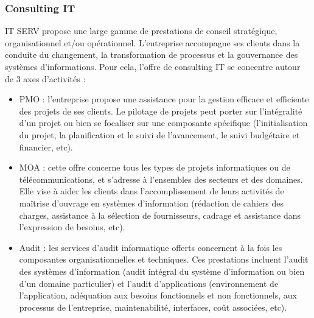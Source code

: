 \begin{spacing}{1.5}
\subsubsection*{Consulting IT} %
IT SERV propose une large gamme de prestations de conseil stratégique, organisationnel et/ou opérationnel. L'entreprise accompagne ses clients dans la conduite du changement, la transformation de processus et la gouvernance des systèmes d’informations. Pour cela, l'offre de consulting IT se concentre autour de 3 axes d’activités :
\begin{itemize}
    \item PMO : l'entreprise propose une assistance pour la gestion efficace et efficiente des projets de ses clients. Le pilotage de projets peut porter sur l’intégralité d’un projet ou bien se focaliser sur une composante spécifique (l’initialisation du projet, la planification et le suivi de l’avancement, le suivi budgétaire et financier, etc).
    \item MOA : cette offre concerne tous les types de projets informatiques ou de télécommunications, et s’adresse à l’ensembles des secteurs et des domaines. Elle vise à aider les clients dans l’accomplissement de leurs activités de maîtrise d’ouvrage en systèmes d’information (rédaction de cahiers des charges, assistance à la sélection de fournisseurs, cadrage et assistance dans l’expression de besoins, etc).
    \item Audit : les services d’audit informatique offerts concernent à la fois les composantes organisationnelles et techniques. Ces prestations incluent l'audit des systèmes d’information (audit intégral du système d’information ou bien d'un domaine particulier) et l'audit d'applications (environnement de l’application, adéquation aux besoins fonctionnels et non fonctionnels, aux processus de l’entreprise, maintenabilité, interfaces, coût associées, etc).
\end{itemize}

\end{spacing}
